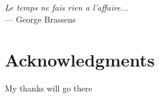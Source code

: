 
\begin{flushright}{\slshape    
    Le temps ne fais rien a l'affaire...} \\ \medskip
    --- George Brassens
\end{flushright}



\bigskip

\begingroup
\let\clearpage\relax
\let\cleardoublepage\relax
\let\cleardoublepage\relax
\chapter*{Acknowledgments}
My thanks will go there

\bigskip



\endgroup



